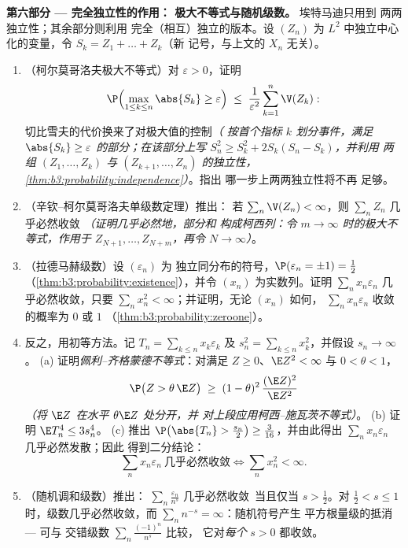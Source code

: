 \begin{problem}
\medskip
\noindent\textbf{第六部分 --- 完全独立性的作用：
极大不等式与随机级数。} 埃特马迪只用到
两两独立性；其余部分则利用
完全（相互）独立的版本。设 $(Z_n)$ 为
$L^2$ 中独立中心化的变量，令 $S_k = Z_1 + \dots + Z_k$（新
记号，与上文的 $X_n$ 无关）。
\begin{enumerate}[resume]
  \item （柯尔莫哥洛夫极大不等式）对 $\varepsilon
        > 0$，证明
        \[
        \P\Bigl(\max_{1\leq k\leq n}\abs{S_k} \geq
        \varepsilon\Bigr) \;\leq\;
        \frac1{\varepsilon^2}\sum_{k=1}^n\V(Z_k) :
        \]
        切比雪夫的代价换来了对极大值的控制\emph{（
        按首个指标 $k$ 划分事件，满足
        $\abs{S_k} \geq \varepsilon$ 的部分；在该部分上写
        $S_n^2 \geq S_k^2 + 2S_k(S_n - S_k)$，并利用
        两组 $(Z_1, \dots, Z_k)$ 与
        $(Z_{k+1}, \dots, Z_n)$ 的独立性，
        \cref{thm:b3:probability:independence}）}。指出
        哪一步上两两独立性将不再
        足够。
  \item （辛钦–柯尔莫哥洛夫单级数定理）推出：
        若 $\sum_n\V(Z_n) < \infty$，则 $\sum_nZ_n$
        几乎必然收敛 \emph{（证明几乎必然地，部分和
        构成柯西列：令 $m \to
        \infty$ 时的极大不等式，作用于
        $Z_{N+1}, \dots, Z_{N+m}$，再令 $N \to
        \infty$）}。
  \item （拉德马赫级数）设 $(\varepsilon_n)$ 为
        独立同分布的符号，$\P(\varepsilon_n = \pm1) =
        \frac12$（\cref{thm:b3:probability:existence}），并令
        $(x_n)$ 为实数列。证明
        $\sum_nx_n\varepsilon_n$ 几乎必然收敛，只要
        $\sum_nx_n^2 < \infty$；并证明，无论
        $(x_n)$ 如何，
        $\sum_nx_n\varepsilon_n$ 收敛的概率为 $0$ 或 $1$
        （\cref{thm:b3:probability:zeroone}）。
  \item 反之，用初等方法。记 $T_n = \sum_{k\leq
        n}x_k\varepsilon_k$ 及 $s_n^2 = \sum_{k\leq
        n}x_k^2$，并假设 $s_n \to \infty$。
        (a) 证明\emph{佩利–齐格蒙德不等式}：对满足
        $Z \geq 0$、$\E Z^2 < \infty$ 与 $0 < \theta <
        1$，
        \[
        \P\bigl(Z > \theta\,\E Z\bigr) \;\geq\; (1 -
        \theta)^2\,\frac{(\E Z)^2}{\E Z^2}
        \]
        \emph{（将 $\E Z$ 在水平 $\theta\E Z$ 处分开，并
        对上段应用柯西–施瓦茨不等式）}。
        (b) 证明 $\E T_n^4 \leq 3s_n^4$。
        (c) 推出 $\P\bigl(\abs{T_n} > \frac{s_n}2\bigr)
        \geq \frac3{16}$，并由此得出
        $\sum_nx_n\varepsilon_n$ 几乎必然发散；因此
        得到二分结论：
        \[
        \sum_nx_n\varepsilon_n\ \text{几乎必然收敛}
        \iff \sum_nx_n^2 < \infty .
        \]
  \item （随机调和级数）推出：
        $\sum_n\frac{\varepsilon_n}{n^s}$ 几乎必然收敛\
        当且仅当 $s > \frac12$。对 $\frac12 < s \leq
        1$ 时，级数几乎必然收敛，而
        $\sum_nn^{-s} = \infty$：随机符号产生
        平方根量级的抵消 --- 可与
        交错级数 $\sum_n\frac{(-1)^n}{n^s}$ 比较，
        它对\emph{每个} $s > 0$ 都收敛。
\end{enumerate}


\end{problem}

